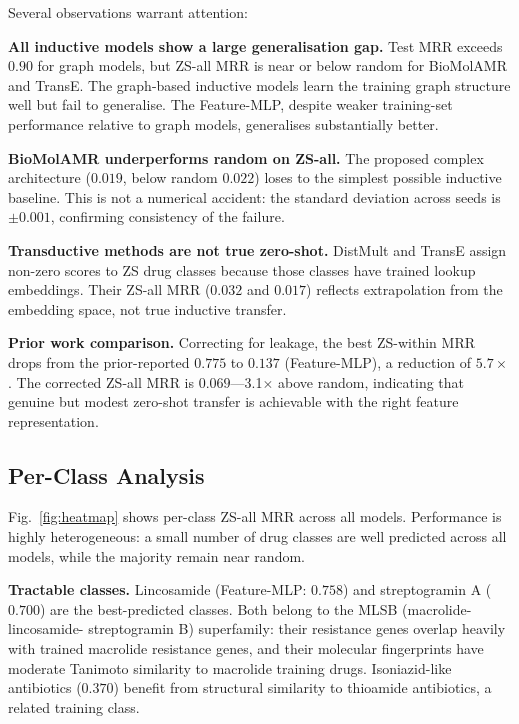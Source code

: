 \documentclass[conference]{IEEEtran}
\begin{document}
Several observations warrant attention:

\textbf{All inductive models show a large generalisation gap.} Test MRR
exceeds $0.90$ for graph models, but ZS-all MRR is near or below random for
BioMolAMR and TransE. The graph-based inductive models learn the training
graph structure well but fail to generalise. The Feature-MLP, despite weaker
training-set performance relative to graph models, generalises substantially
better.

\textbf{BioMolAMR underperforms random on ZS-all.} The proposed complex
architecture ($0.019$, below random $0.022$) loses to the simplest possible
inductive baseline. This is not a numerical accident: the standard deviation
across seeds is $\pm0.001$, confirming consistency of the failure.

\textbf{Transductive methods are not true zero-shot.} DistMult and TransE
assign non-zero scores to ZS drug classes because those classes have trained
lookup embeddings. Their ZS-all MRR ($0.032$ and $0.017$) reflects
extrapolation from the embedding space, not true inductive transfer.

\textbf{Prior work comparison.} Correcting for leakage, the best ZS-within MRR
drops from the prior-reported $0.775$ to $0.137$ (Feature-MLP), a reduction of
$5.7\times$. The corrected ZS-all MRR is $0.069$---3.1$\times$ above random,
indicating that genuine but modest zero-shot transfer is achievable with the
right feature representation.

\subsection{Per-Class Analysis}
\label{sec:perclass}

Fig.~\ref{fig:heatmap} shows per-class ZS-all MRR across all models.
Performance is highly heterogeneous: a small number of drug classes are well
predicted across all models, while the majority remain near random.

\textbf{Tractable classes.}
Lincosamide (Feature-MLP: $0.758$) and streptogramin A ($0.700$) are the
best-predicted classes. Both belong to the MLSB (macrolide-lincosamide-
streptogramin B) superfamily: their resistance genes overlap heavily with
trained macrolide resistance genes, and their molecular fingerprints have
moderate Tanimoto similarity to macrolide training drugs. Isoniazid-like
antibiotics ($0.370$) benefit from structural similarity to thioamide
antibiotics, a related training class.
\end{document}
